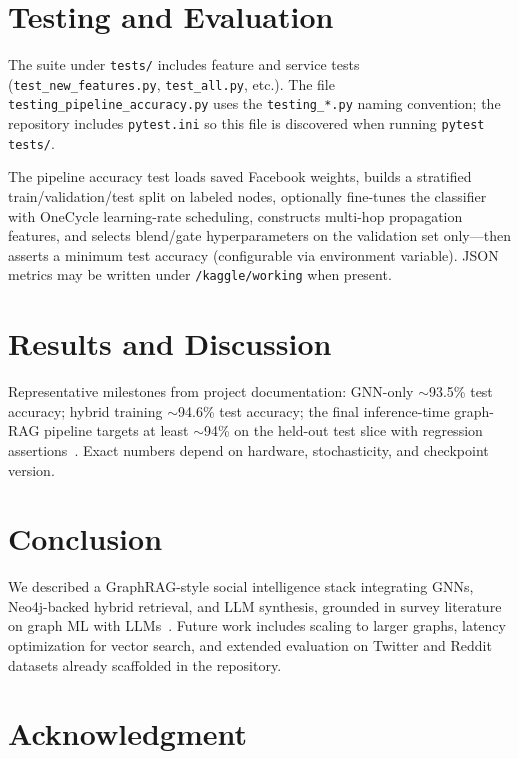 \documentclass[conference]{IEEEtran}
\begin{document}
\section{Testing and Evaluation}

The suite under \texttt{tests/} includes feature and service tests (\texttt{test\_new\_features.py}, \texttt{test\_all.py}, etc.). The file \texttt{testing\_pipeline\_accuracy.py} uses the \texttt{testing\_*.py} naming convention; the repository includes \texttt{pytest.ini} so this file is discovered when running \texttt{pytest tests/}.

The pipeline accuracy test loads saved Facebook weights, builds a stratified train/validation/test split on labeled nodes, optionally fine-tunes the classifier with OneCycle learning-rate scheduling, constructs multi-hop propagation features, and selects blend/gate hyperparameters on the validation set only---then asserts a minimum test accuracy (configurable via environment variable). JSON metrics may be written under \texttt{/kaggle/working} when present.

\section{Results and Discussion}

Representative milestones from project documentation: GNN-only $\sim$93.5\% test accuracy; hybrid training $\sim$94.6\% test accuracy; the final inference-time graph-RAG pipeline targets at least $\sim$94\% on the held-out test slice with regression assertions~\cite{project_doc_internal}. Exact numbers depend on hardware, stochasticity, and checkpoint version.

\section{Conclusion}

We described a GraphRAG-style social intelligence stack integrating GNNs, Neo4j-backed hybrid retrieval, and LLM synthesis, grounded in survey literature on graph ML with LLMs~\cite{acm_survey_gml_llm}. Future work includes scaling to larger graphs, latency optimization for vector search, and extended evaluation on Twitter and Reddit datasets already scaffolded in the repository.

\section*{Acknowledgment}
\end{document}

